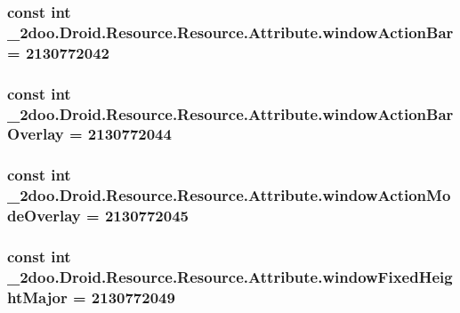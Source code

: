 \hypertarget{class__2doo_1_1_droid_1_1_resource_1_1_attribute_22644611746e6dc0eb8976f4fe8ec4e8}{
\subsubsection[{windowActionBar}]{\setlength{\rightskip}{0pt plus 5cm}const int \_\-2doo.Droid.Resource.Resource.Attribute.windowActionBar = 2130772042}}
\label{class__2doo_1_1_droid_1_1_resource_1_1_attribute_22644611746e6dc0eb8976f4fe8ec4e8}


\hypertarget{class__2doo_1_1_droid_1_1_resource_1_1_attribute_43670818784581db0258866a20a49c21}{
\subsubsection[{windowActionBarOverlay}]{\setlength{\rightskip}{0pt plus 5cm}const int \_\-2doo.Droid.Resource.Resource.Attribute.windowActionBarOverlay = 2130772044}}
\label{class__2doo_1_1_droid_1_1_resource_1_1_attribute_43670818784581db0258866a20a49c21}


\hypertarget{class__2doo_1_1_droid_1_1_resource_1_1_attribute_d45bc0457a4310987f22a4ceec7dcd03}{
\subsubsection[{windowActionModeOverlay}]{\setlength{\rightskip}{0pt plus 5cm}const int \_\-2doo.Droid.Resource.Resource.Attribute.windowActionModeOverlay = 2130772045}}
\label{class__2doo_1_1_droid_1_1_resource_1_1_attribute_d45bc0457a4310987f22a4ceec7dcd03}


\hypertarget{class__2doo_1_1_droid_1_1_resource_1_1_attribute_8c935d3ebd0228610e9bec7205c90fb4}{
\subsubsection[{windowFixedHeightMajor}]{\setlength{\rightskip}{0pt plus 5cm}const int \_\-2doo.Droid.Resource.Resource.Attribute.windowFixedHeightMajor = 2130772049}}
\label{class__2doo_1_1_droid_1_1_resource_1_1_attribute_8c935d3ebd0228610e9bec7205c90fb4}


